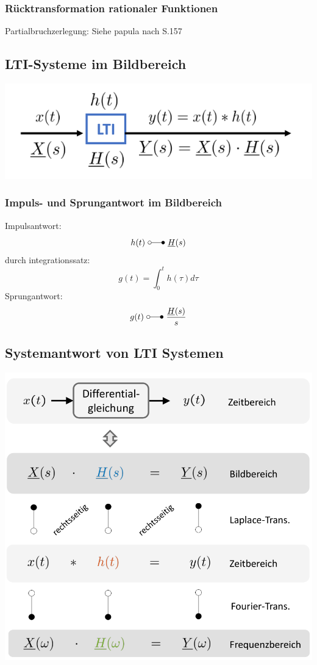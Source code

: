 \subsubsection{Rücktransformation rationaler Funktionen}
\footnotesize
Partialbruchzerlegung: Siehe papula nach S.157

\normalsize
\subsection{LTI-Systeme im Bildbereich}
\begin{center}
    \includegraphics[width=0.6\columnwidth]{Bilder/LTI_Systeme_im_Bildbereich.png}
\end{center}

\subsubsection{Impuls- und Sprungantwort im Bildbereich}
Impulsantwort:
\[
    h(t)\ \laplace\ \underline{H}(s)
\]
durch integrationssatz:
\[
    g(t) = \int_0^t h(\tau) d\tau
\]
Sprungantwort:
\[
    g(t)\ \laplace\ \frac{\underline{H}(s)}{s}
\]


\subsection{Systemantwort von LTI Systemen}
\includegraphics[width=0.98\columnwidth]{Bilder/LTI_Systemantworten.png}
